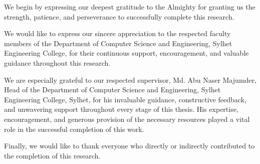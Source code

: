 We begin by expressing our deepest gratitude to the Almighty for granting us the strength, patience, and perseverance to successfully complete this research.

We would like to express our sincere appreciation to the respected faculty members of the Department of Computer Science and Engineering, Sylhet Engineering College, for their continuous support, encouragement, and valuable guidance throughout this research.

We are especially grateful to our respected supervisor, Md. Abu Naser Majumder, Head of the Department of Computer Science and Engineering, Sylhet Engineering College, Sylhet, for his invaluable guidance, constructive feedback, and unwavering support throughout every stage of this thesis. His expertise, encouragement, and generous provision of the necessary resources played a vital role in the successful completion of this work.

Finally, we would like to thank everyone who directly or indirectly contributed to the completion of this research.
